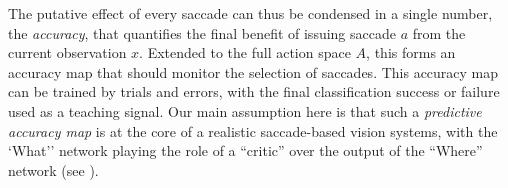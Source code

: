 The putative effect of every saccade can thus be condensed in a single number, the \emph{accuracy}, that quantifies the final benefit of issuing saccade $a$ %
from the current observation $x$.
 Extended to the full action space $A$, this forms an accuracy map that should monitor the selection of saccades. %
This accuracy map can be trained by trials and errors, with the final classification success or failure used as a teaching signal. Our main assumption here is that such a \emph{predictive accuracy map} is at the core of a realistic saccade-based vision systems, with the `What'' network playing the role of a ``critic'' over the output of the ``Where'' network (see \cite{sutton1998reinforcement}).

